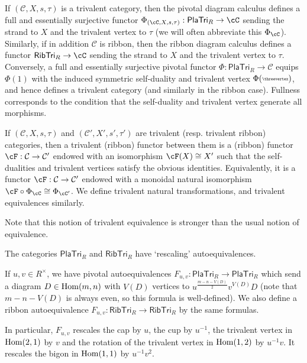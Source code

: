\documentclass[12pt]{amsart}
\begin{document}
If $(\mathcal{C}, X, s, \tau)$ is a trivalent category, then the pivotal diagram calculus \cite{MR2767048} defines a full and essentially surjective functor  $\Phi_{(\cC, X, s, \tau)}: \mathsf{PlaTri}_R \rightarrow \cC$ sending the strand to $X$ and the trivalent vertex to $\tau$ (we will often abbreviate this $\Phi_{\cC}$). Similarly, if in addition $\mathcal{C}$ is ribbon, then the ribbon diagram calculus defines a functor  $\mathsf{RibTri}_R \rightarrow \cC$ sending the strand to $X$ and the trivalent vertex to $\tau$. Conversely, a full and essentially surjective pivotal functor $\Phi\colon\mathsf{PlaTri}_R\to\mathcal C$ equips $\Phi(1)$ with the induced symmetric self-duality and trivalent vertex $\Phi(\smallfig{\threevertex})$, and hence defines a trivalent category (and similarly in the ribbon case). Fullness corresponds to the condition that the self-duality and trivalent vertex generate all morphisms.

\begin{definition}
    If $(\mathcal{C},X,s,\tau)$ and $(\mathcal{C}',X',s',\tau')$ are trivalent (resp. trivalent ribbon) categories, then a trivalent (ribbon) functor between them is a (ribbon) functor $\cF: \mathcal{C} \rightarrow \mathcal{C}'$ endowed with an isomorphism $\cF(X) \cong X'$ such that the self-dualities and trivalent vertices satisfy the obvious identities. Equivalently, it is a functor $\cF: \mathcal{C} \rightarrow \mathcal{C}'$ endowed with a monoidal natural isomorphism $\cF \circ \Phi_\cC \cong \Phi_{\cC'}$. We define trivalent natural transformations, and trivalent equivalences similarly.
\end{definition}

Note that this notion of trivalent equivalence is stronger than the usual notion of equivalence.

The categories $\mathsf{PlaTri}_R$ and $\mathsf{RibTri}_R$ have `rescaling' autoequivalences.

\begin{definition} \label{def:rescaling}
    If $u,v \in R^\times$, we have pivotal autoequivalences $F_{u,v}: \mathsf{PlaTri}_R \rightarrow \mathsf{PlaTri}_R$ which send a diagram $D \in \operatorname{Hom}(m,n)$ with $V(D)$ vertices to $u^{\frac{m-n-V(D)}{2}} v^{V(D)} D$ (note that $m-n-V(D)$ is always even, so this formula is well-defined). We also define a ribbon autoequivalence $F_{u,v}: \mathsf{RibTri}_R \rightarrow \mathsf{RibTri}_R$ by the same formulas.
\end{definition}

In particular, $F_{u,v}$ rescales the cap by $u$, the cup by $u^{-1}$, the trivalent vertex in $\operatorname{Hom}(2,1)$ by $v$ and the rotation of the trivalent vertex in $\operatorname{Hom}(1,2)$ by $u^{-1} v$. It rescales the bigon in $\operatorname{Hom}(1,1)$ by $u^{-1} v^2$.
 
\end{document}
